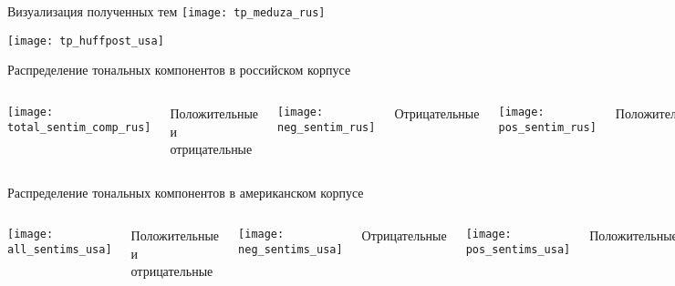 \documentclass[xetex, aspectratio = 169]{beamer}
\begin{document}
\begin{frame}{Визуализация полученных тем}
	\centering
	\texttt{[image: tp\_meduza\_rus]}

	\texttt{[image: tp\_huffpost\_usa]}
\end{frame}

\begin{frame}{Распределение тональных компонентов в российском корпусе}
	\begin{columns}
		\centering
		\texttt{[image: total\_sentim\_comp\_rus]}
		\vspace{0.3em}

		Положительные и отрицательные

		\centering
		\texttt{[image: neg\_sentim\_rus]}
		\vspace{0.3em}

		Отрицательные

		\centering
		\texttt{[image: pos\_sentim\_rus]}
		\vspace{0.3em}

		Положительные
	\end{columns}
\end{frame}

\begin{frame}{Распределение тональных компонентов в американском корпусе}
    \begin{columns}
        \centering
        \texttt{[image: all\_sentims\_usa]}
        \vspace{0.3em}

        Положительные и отрицательные

        \centering
        \texttt{[image: neg\_sentims\_usa]}
        \vspace{0.3em}

        Отрицательные

        \centering
        \texttt{[image: pos\_sentims\_usa]}
        \vspace{0.3em}

        Положительные
    \end{columns}
\end{frame}
\end{document}
